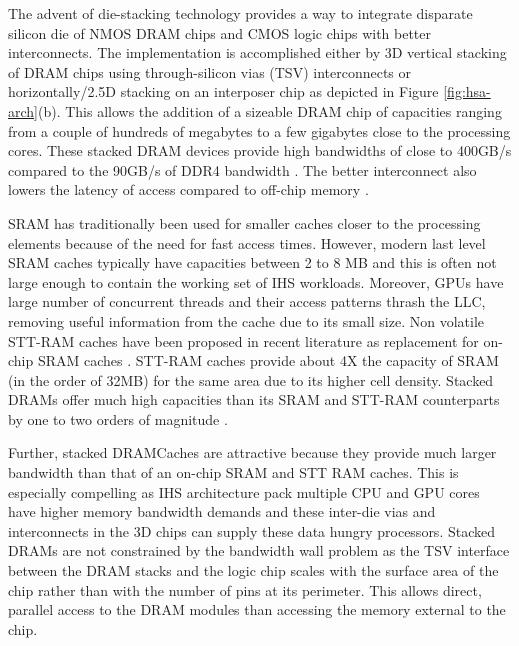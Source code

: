 \par The advent of die-stacking technology \cite{3d-stacking} provides a way to integrate disparate silicon die of NMOS DRAM chips and CMOS logic chips with better interconnects. The implementation is accomplished either by 3D vertical stacking of DRAM chips using through-silicon vias (TSV) interconnects or horizontally/2.5D stacking on an interposer chip as depicted in Figure \ref{fig:hsa-arch}(b). This allows the addition of a sizeable DRAM chip of capacities ranging from a couple of hundreds of megabytes to a few gigabytes close to the processing cores. These stacked DRAM devices provide high bandwidths of close to 400GB/s compared to the 90GB/s of DDR4 bandwidth \cite{xeonphi}. The better interconnect also lowers the latency of access compared to off-chip memory \cite{alloy}. 
\par SRAM has traditionally been used for smaller caches closer to the processing elements because of the need for fast access times.
However, modern last level SRAM caches typically have capacities between 2 to 8 MB \cite{skylake} and this is often not large enough to contain the working set of IHS workloads.
Moreover, GPUs have large number of concurrent threads and their access patterns thrash the LLC, removing useful information from the cache due to its small size. 
Non volatile STT-RAM caches have been proposed in recent literature as replacement for on-chip SRAM caches \cite{oscar}. STT-RAM caches provide about 4X the capacity of SRAM \cite{oscar} (in the order of 32MB) for the same area due to its higher cell density.
Stacked DRAMs offer much high capacities than its SRAM and STT-RAM counterparts by one to two orders of magnitude \cite{3d-stacked}.
\par Further, stacked DRAMCaches are attractive because they provide much larger bandwidth than that of an on-chip SRAM and STT RAM caches.
This is especially compelling as IHS architecture pack multiple CPU and GPU cores have higher memory bandwidth demands and these inter-die vias and interconnects in the 3D chips can supply these data hungry processors.
Stacked DRAMs are not constrained by the bandwidth wall problem as the TSV interface between the DRAM stacks and the logic chip scales with the surface area of the chip rather than with the number of pins at its perimeter. This allows direct, parallel access to the DRAM modules than accessing the memory external to the chip.
